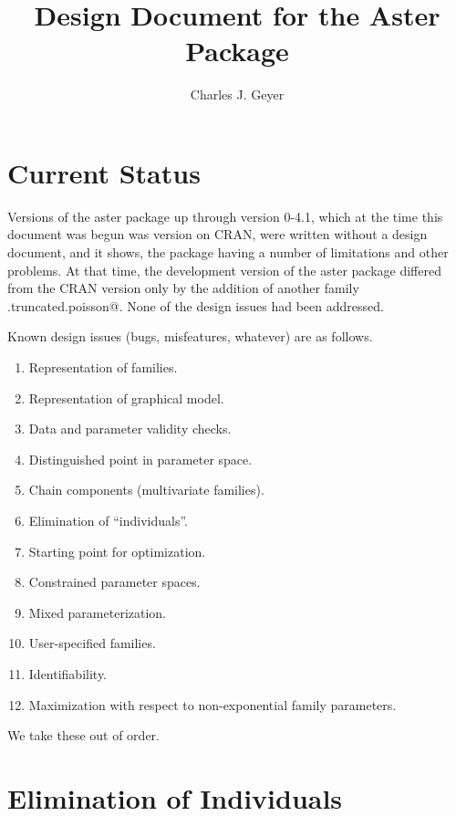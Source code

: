 \documentclass[11pt]{article}
\begin{document}
\title{Design Document for the Aster Package}

\author{Charles J. Geyer}

\maketitle

\section{Current Status}

Versions of the aster package up through version 0-4.1,
which at the time this document was begun was version on CRAN,
were written without a design document, and it
shows, the package having a number of limitations and other problems.
At that time, the development version of the
aster package differed from the CRAN version only by the addition
of another family \verb@two.truncated.poisson@.
None of the design issues had been addressed.

Known design issues (bugs, misfeatures, whatever) are as follows.
\begin{enumerate}
\item Representation of families. \label{it:family}
\item Representation of graphical model. \label{it:graph}
\item Data and parameter validity checks. \label{it:valid}
\item Distinguished point in parameter space. \label{it:point}
\item Chain components (multivariate families). \label{it:chain}
\item Elimination of ``individuals''. \label{it:ind}
\item Starting point for optimization. \label{it:start}
\item Constrained parameter spaces. \label{it:constrain}
\item Mixed parameterization. \label{it:mix}
\item User-specified families. \label{it:user}
\item Identifiability. \label{it:identify}
\item Maximization with respect to non-exponential family parameters.
    \label{it:non-expo}
\end{enumerate}
We take these out of order.

\section{Elimination of Individuals}
\end{document}
